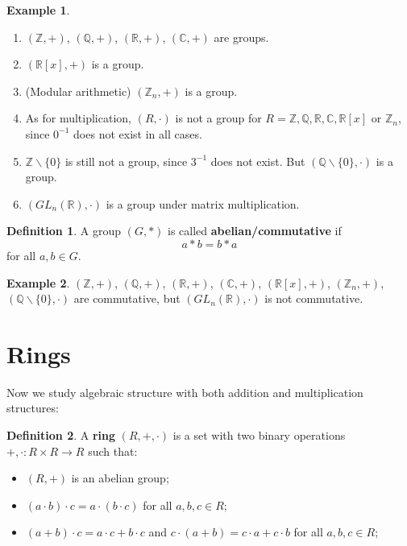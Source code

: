 \documentclass[11pt,openany]{book}
\theoremstyle{plain}
\theoremstyle{definition}
\newtheorem{definition}[definition]{Definition}
\newtheorem{example}[example]{Example}
\theoremstyle{remark}
\begin{document}
\begin{example}
    \begin{enumerate}
        \item $(\mathbb{Z},+)$, $(\mathbb{Q},+)$, $(\mathbb{R},+)$, $(\mathbb{C},+)$ are groups.
        \item $(\mathbb{R}[x],+)$ is a group.
        \item (Modular arithmetic) $(\mathbb{Z}_n,+)$ is a group.
        \item As for multiplication, $(R,\cdot)$ is not a group for $R = \mathbb{Z}, \mathbb{Q}, \mathbb{R}, \mathbb{C}, \mathbb{R}[x]$ or $\mathbb{Z}_n$, since $0^{-1}$ does not exist in all cases.
        \item $\mathbb{Z} \backslash \{0\}$ is still not a group, since $3^{-1}$ does not exist. But $(\mathbb{Q}\backslash \{0\}, \cdot)$ is a group.
        \item $(GL_n(\mathbb{R}), \cdot)$ is a group under matrix multiplication.
    \end{enumerate}
\end{example}    

\begin{definition}
    A group $(G, \ast)$ is called {\bf abelian/commutative} if
    $$a \ast b = b \ast a$$
    for all $a, b \in G$.
\end{definition}

\begin{example}
$(\mathbb{Z},+)$, $(\mathbb{Q},+)$, $(\mathbb{R},+)$, $(\mathbb{C},+)$, $(\mathbb{R}[x],+)$, $(\mathbb{Z}_n,+)$, $(\mathbb{Q}\backslash \{0\}, \cdot)$ are commutative, but $(GL_n(\mathbb{R}), \cdot)$ is not commutative.
\end{example}    

\section{Rings}
Now we study algebraic structure with both addition and multiplication structures:
\begin{definition}
    A {\bf ring} $(R,+,\cdot)$ is a set with two binary operations $+, \cdot: R \times R \to R$ such that:
    \begin{itemize}
        \item $(R,+)$ is an abelian group;
        \item $(a\cdot b) \cdot c = a \cdot (b \cdot c)$ for all $a, b, c \in R$;
        \item $(a+b)\cdot c = a\cdot c + b \cdot c$ and $c \cdot (a+b) = c\cdot a + c\cdot b$ for all $a, b, c \in R$;
    \end{itemize}
\end{definition}
\end{document}

